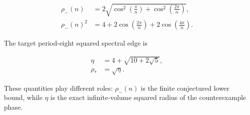\begin{equation}
\label{eq:conjectured-threshold}
\begin{aligned}
\rho_-(n)&=2 \sqrt{\cos^{2}(\frac{\pi}{n})+\cos^{2}(\frac{2\pi}{n})}, \\
\rho_-(n)^{2}&=4+2\cos(\frac{2\pi}{n})+2\cos(\frac{4\pi}{n}).
\end{aligned}
\end{equation}

The target period-eight squared spectral edge is

\begin{equation}
\label{eq:target-edge}
\begin{aligned}
\eta&=4+\sqrt{10+2\sqrt{5}}, \\
\rho_*&=\sqrt{\eta}.
\end{aligned}
\end{equation}

These quantities play different roles: \(\rho_-(n)\) is the finite conjectured
lower bound, while \(\eta\) is the exact infinite-volume squared radius of the
counterexample phase.
